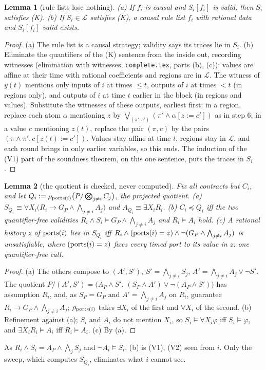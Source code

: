 \documentclass[10pt]{article}
\theoremstyle{tplain}\newtheorem{theorem}{Theorem}\newtheorem{lemma}[theorem]{Lemma}\newtheorem{proposition}[theorem]{Proposition}\newtheorem{corollary}[theorem]{Corollary}\newtheorem{claim}[theorem]{Claim}
\theoremstyle{tdef}\newtheorem{definition}[theorem]{Definition}
\begin{document}
\begin{lemma}[rule lists lose nothing]\label{lem:rules}
(a) If $f_i$ is causal and $S_i[f_i]$ is valid, then $S_i$ satisfies (K). (b) If $S_i\in\mathcal L$ satisfies (K), a causal rule list $f_i$ with rational data and $S_i[f_i]$ valid exists.
\end{lemma}
\begin{proof}
(a) The rule list is a causal strategy; validity says its traces lie in $S_i$. (b) Eliminate the quantifiers of the (K) sentence from the inside out, recording witnesses (elimination with witnesses, \texttt{complete.tex}, parts (b), (c)): values are affine at their time with rational coefficients and regions are in $\mathcal L$. The witness of $y(t)$ mentions only inputs of $i$ at times $\le t$, outputs of $i$ at times $<t$ (in regions only), and outputs of $i$ at time $t$ earlier in the block (in regions and values). Substitute the witnesses of these outputs, earliest first: in a region, replace each atom $\alpha$ mentioning $z$ by $\bigvee_{(\pi',c')}(\pi'\wedge\alpha[z:=c'])$ as in step 6; in a value $c$ mentioning $z(t)$, replace the pair $(\pi,c)$ by the pairs $(\pi\wedge\pi',c[z(t):=c'])$. Values stay affine at time $t$, regions stay in $\mathcal L$, and each round brings in only earlier variables, so this ends. The induction of the (V1) part of the soundness theorem, on this one sentence, puts the traces in $S_i$.
\end{proof}
\begin{lemma}[the quotient is checked, never computed]\label{lem:quot}
Fix all contracts but $C_i$, and let $Q_i:=\rho_{\mathrm{ports}(i)}\big(P/\bigotimes_{j\ne i}C_j\big)$, the projected quotient. (a) $S_{Q_i}\equiv\forall X_i\big(R_i\to G_P\wedge\bigwedge_{j\ne i}A_j\big)$ and $A_{Q_i}\equiv\exists X_iR_i$. (b) $C_i\preccurlyeq Q_i$ iff the two quantifier-free validities $R_i\wedge S_i\models G_P\wedge\bigwedge_{j\ne i}A_j$ and $R_i\models A_i$ hold. (c) A rational history $z$ of $\mathrm{ports}(i)$ lies in $S_{Q_i}$ iff $R_i\wedge(\mathrm{ports}(i)=z)\wedge\neg(G_P\wedge\bigwedge_{j\ne i}A_j)$ is unsatisfiable, where $(\mathrm{ports}(i)=z)$ fixes every timed port to its value in $z$: one quantifier-free call.
\end{lemma}
\begin{proof}
(a) The others compose to $(A',S')$, $S'=\bigwedge_{j\ne i}S_j$, $A'=\bigwedge_{j\ne i}A_j\vee\neg S'$. The quotient $P/(A',S')=\big(A_P\wedge S',\,(S_P\wedge A')\vee\neg(A_P\wedge S')\big)$ has assumption $R_i$, and, as $S_P=G_P$ and $A'=\bigwedge_{j\ne i}A_j$ on $R_i$, guarantee $R_i\to G_P\wedge\bigwedge_{j\ne i}A_j$; $\rho_{\mathrm{ports}(i)}$ takes $\exists X_i$ of the first and $\forall X_i$ of the second. (b) Refinement against (a); $S_i$ and $A_i$ do not mention $X_i$, so $S_i\models\forall X_i\varphi$ iff $S_i\models\varphi$, and $\exists X_iR_i\models A_i$ iff $R_i\models A_i$. (c) By (a).
\end{proof}
As $R_i\wedge S_i=A_P\wedge\bigwedge_jS_j$ and $\neg A_i\models S_i$, (b) is (V1), (V2) seen from $i$. Only the sweep, which computes $S_{Q_i}$, eliminates what $i$ cannot see.
\end{document}

